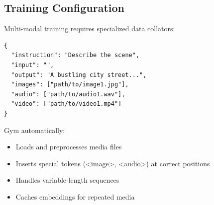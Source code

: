 \subsection{Training Configuration}

Multi-modal training requires specialized data collators:

\begin{verbatim}
{
  "instruction": "Describe the scene",
  "input": "",
  "output": "A bustling city street...",
  "images": ["path/to/image1.jpg"],
  "audio": ["path/to/audio1.wav"],
  "video": ["path/to/video1.mp4"]
}
\end{verbatim}

Gym automatically:
\begin{itemize}
\item Loads and preprocesses media files
\item Inserts special tokens (<image>, <audio>) at correct positions
\item Handles variable-length sequences
\item Caches embeddings for repeated media
\end{itemize}

